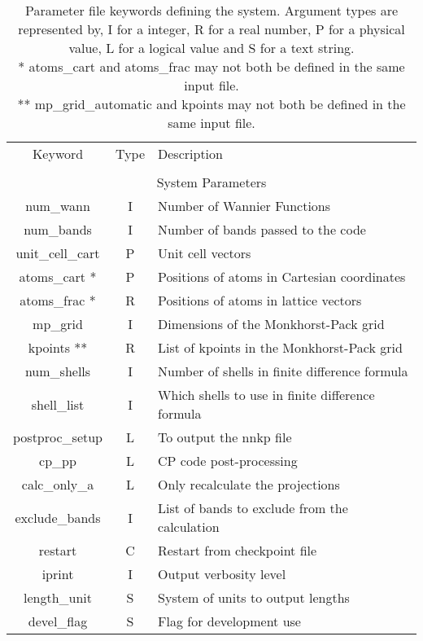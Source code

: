 \begin{table}
\begin{center}
\begin{tabular}{|c|c|p{6cm}|}
\hline
Keyword & Type & Description \\
        &      &             \\
\hline\hline
\multicolumn{3}{|c|}{System Parameters} \\
\hline
{\sc num\_wann }   & I & Number of Wannier Functions \\
{\sc num\_bands }   & I & Number of bands passed to the code \\
{\sc unit\_cell\_cart }   & P & Unit cell vectors \\
{\sc atoms\_cart }*   & P & Positions of atoms in Cartesian coordinates \\
{\sc atoms\_frac }*   & R & Positions of atoms in lattice vectors \\
{\sc mp\_grid }   & I & Dimensions of the Monkhorst-Pack grid \\
{\sc kpoints }**   & R & List of kpoints in the Monkhorst-Pack grid \\
{\sc num\_shells }   & I & Number of shells in finite difference formula \\
{\sc shell\_list }   & I & Which shells to use in finite difference formula \\
{\sc postproc\_setup }   & L & To output the nnkp file \\
{\sc cp\_pp }   & L & CP code post-processing \\
{\sc calc\_only\_a }   & L & Only recalculate the projections \\
{\sc exclude\_bands }   & I & List of bands to exclude from the calculation \\
{\sc restart }   & C & Restart from checkpoint file \\
{\sc iprint }   & I & Output verbosity level \\
{\sc length\_unit }   & S & System of units to output lengths \\
{\sc devel\_flag }   & S & Flag for development use \\
\hline
\end{tabular}
\caption[Parameter file keywords controlling system parameters.]
{Parameter file keywords defining the system.  Argument types
are represented by, I for a integer, R for a real number, P for a
physical value, L for a logical value and S for a text string.\\
 {\footnotesize
* {\sc atoms\_cart } and  {\sc atoms\_frac } may not both be defined in the same input file.\\
** {\sc mp\_grid\_automatic } and  {\sc kpoints } may not both be defined in the same input file.
}}
\label{parameter_keywords1}
\end{center}
\end{table}



